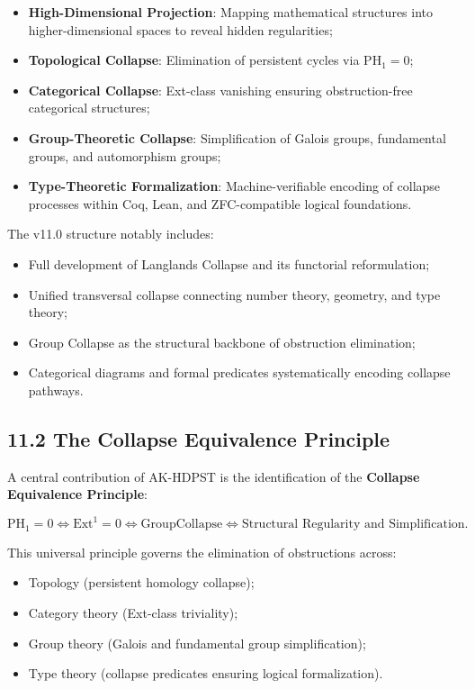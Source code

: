 \documentclass[11pt]{article}
\begin{document}
\begin{itemize}
    \item \textbf{High-Dimensional Projection}: Mapping mathematical structures into higher-dimensional spaces to reveal hidden regularities;
    \item \textbf{Topological Collapse}: Elimination of persistent cycles via \( \mathrm{PH}_1 = 0 \);
    \item \textbf{Categorical Collapse}: Ext-class vanishing ensuring obstruction-free categorical structures;
    \item \textbf{Group-Theoretic Collapse}: Simplification of Galois groups, fundamental groups, and automorphism groups;
    \item \textbf{Type-Theoretic Formalization}: Machine-verifiable encoding of collapse processes within Coq, Lean, and ZFC-compatible logical foundations.
\end{itemize}

The v11.0 structure notably includes:

\begin{itemize}
    \item Full development of Langlands Collapse and its functorial reformulation;
    \item Unified transversal collapse connecting number theory, geometry, and type theory;
    \item Group Collapse as the structural backbone of obstruction elimination;
    \item Categorical diagrams and formal predicates systematically encoding collapse pathways.
\end{itemize}

\subsection*{11.2 The Collapse Equivalence Principle}

A central contribution of AK-HDPST is the identification of the \textbf{Collapse Equivalence Principle}:

\[
\mathrm{PH}_1 = 0 \iff \mathrm{Ext}^1 = 0 \iff \mathrm{GroupCollapse} \iff \text{Structural Regularity and Simplification}.
\]

This universal principle governs the elimination of obstructions across:

\begin{itemize}
    \item Topology (persistent homology collapse);
    \item Category theory (Ext-class triviality);
    \item Group theory (Galois and fundamental group simplification);
    \item Type theory (collapse predicates ensuring logical formalization).
\end{itemize}
\end{document}
